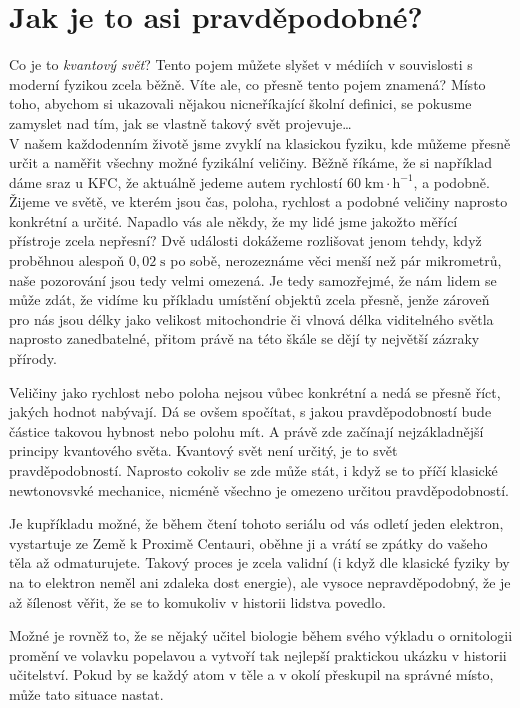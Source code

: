 \documentclass[crop=false]{standalone}
\begin{document}
\section*{Jak je to asi pravděpodobné?}
\quad

Co je to \textit{kvantový svět}? Tento pojem můžete slyšet v médiích v souvislosti s moderní fyzikou zcela běžně. Víte ale, co přesně tento pojem znamená? Místo toho, abychom si ukazovali nějakou nicneříkající školní definici, se pokusme zamyslet nad tím, jak se vlastně takový svět projevuje\dots
\\

V našem každodenním životě jsme zvyklí na klasickou fyziku, kde můžeme přesně určit a naměřit všechny možné fyzikální veličiny. Běžně říkáme, že si například dáme sraz u KFC, že aktuálně jedeme autem rychlostí $60\;\mathrm{km\cdot h^{-1}}$, a podobně. Žijeme ve světě, ve kterém jsou čas, poloha, rychlost a podobné veličiny naprosto konkrétní a určité. Napadlo vás ale někdy, že my lidé jsme jakožto měřící přístroje zcela nepřesní? Dvě události dokážeme rozlišovat jenom tehdy, když proběhnou alespoň $0,02\;\mathrm{s}$ po sobě, nerozeznáme věci menší než pár mikrometrů, naše pozorování jsou tedy velmi omezená. Je tedy samozřejmé, že nám lidem se může zdát, že vidíme ku příkladu umístění objektů zcela přesně, jenže zároveň pro nás jsou délky jako velikost mitochondrie či vlnová délka viditelného světla
naprosto zanedbatelné, přitom právě na této škále se dějí ty největší zázraky přírody. 

Veličiny jako rychlost nebo poloha nejsou vůbec konkrétní a nedá se přesně říct, jakých hodnot nabývají. Dá se ovšem spočítat, s jakou pravděpodobností bude částice takovou hybnost nebo polohu mít. A právě zde začínají nejzákladnější principy kvantového světa. Kvantový svět není určitý, je to svět pravděpodobností. Naprosto cokoliv se zde může stát, i když se to příčí klasické newtonovsvké mechanice, nicméně všechno je omezeno určitou pravděpodobností.

Je kupříkladu možné, že během čtení tohoto seriálu od vás odletí jeden elektron, vystartuje ze Země k Proximě Centauri, oběhne ji a vrátí se zpátky do vašeho těla až odmaturujete. Takový proces je zcela validní (i když dle klasické fyziky by na to elektron neměl ani zdaleka dost energie), ale vysoce nepravděpodobný, že je až šílenost věřit, že se to komukoliv v historii lidstva povedlo.

Možné je rovněž to, že se nějaký učitel biologie během svého výkladu o ornitologii promění ve volavku popelavou a vytvoří tak nejlepší praktickou ukázku v historii učitelství. Pokud by se každý atom v těle a v okolí přeskupil na správné místo, může tato situace nastat.
\\
\end{document}
